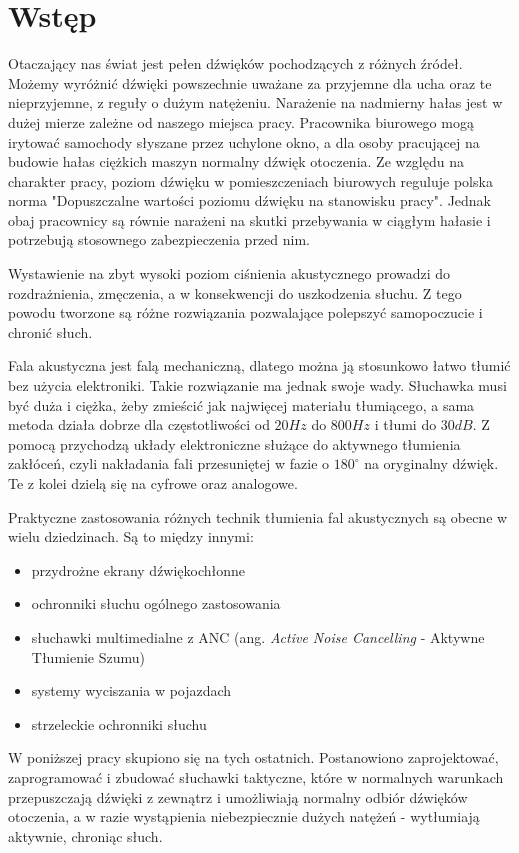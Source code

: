 \chapter{Wstęp}
\label{cha:wstep}

Otaczający nas świat jest pełen dźwięków pochodzących z różnych źródeł. Możemy wyróżnić dźwięki powszechnie uważane za przyjemne dla ucha oraz te nieprzyjemne, z reguły o dużym natężeniu. Narażenie na nadmierny hałas jest w dużej mierze zależne od naszego miejsca pracy. Pracownika biurowego mogą irytować samochody słyszane przez uchylone okno, a dla osoby pracującej na budowie hałas ciężkich maszyn normalny dźwięk otoczenia. Ze względu na charakter pracy, poziom dźwięku w pomieszczeniach biurowych reguluje polska norma "Dopuszczalne wartości poziomu dźwięku na stanowisku pracy"\cite{PolskaNormaCisnienia}. Jednak obaj pracownicy są równie narażeni na skutki przebywania w ciągłym hałasie i potrzebują stosownego zabezpieczenia przed nim.

Wystawienie na zbyt wysoki poziom ciśnienia akustycznego prowadzi do rozdrażnienia, zmęczenia, a w konsekwencji do uszkodzenia słuchu. Z tego powodu tworzone są różne rozwiązania pozwalające polepszyć samopoczucie i chronić słuch. 

Fala akustyczna jest falą mechaniczną, dlatego można ją stosunkowo łatwo tłumić bez użycia elektroniki. Takie rozwiązanie ma jednak swoje wady. Słuchawka musi być duża i ciężka, żeby zmieścić jak najwięcej materiału tłumiącego, a sama metoda działa dobrze dla częstotliwości od $ 20Hz $ do $ 800Hz $ i tłumi do $ 30dB $\cite{SennheiserANC}. Z pomocą przychodzą układy elektroniczne służące do aktywnego tłumienia zakłóceń, czyli nakładania fali przesuniętej w fazie o $180^\circ$ na oryginalny dźwięk. Te z kolei dzielą się na cyfrowe oraz analogowe. 

Praktyczne zastosowania różnych technik tłumienia fal akustycznych są obecne w wielu dziedzinach. Są to między innymi:
\begin{itemize}
	\item przydrożne ekrany dźwiękochłonne
	\item ochronniki słuchu ogólnego zastosowania
	\item słuchawki multimedialne z ANC (ang. \textit{Active Noise Cancelling} - Aktywne Tłumienie Szumu)
	\item systemy wyciszania w pojazdach
	\item strzeleckie ochronniki słuchu
\end{itemize}

W poniższej pracy skupiono się na tych ostatnich. Postanowiono zaprojektować, zaprogramować i zbudować słuchawki taktyczne, które w normalnych warunkach przepuszczają dźwięki z zewnątrz i umożliwiają normalny odbiór dźwięków otoczenia, a w razie wystąpienia niebezpiecznie dużych natężeń - wytłumiają aktywnie, chroniąc słuch.